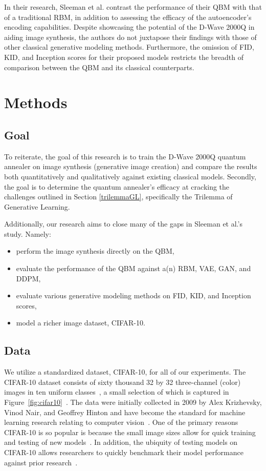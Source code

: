 \documentclass[technologies,article,accept,pdftex,moreauthors]{Definitions/mdpi}
\newcommand{\figref}[1]{Figure~\ref{#1}}
\begin{document}
In their research, Sleeman et al. contrast the performance of their QBM with that of a traditional RBM, in addition to assessing the efficacy of the autoencoder's encoding capabilities. Despite showcasing the potential of the D-Wave 2000Q in aiding image synthesis, the authors do not juxtapose their findings with those of other classical generative modeling methods. Furthermore, the omission of FID, KID, and Inception scores for their proposed models restricts the breadth of comparison between the QBM and its classical counterparts.

\section{Methods}
\subsection{Goal}
To reiterate, the goal of this research is to train the D-Wave 2000Q quantum annealer on image synthesis (generative image creation) and compare the results both quantitatively and qualitatively against existing classical models. Secondly, the goal is to determine the quantum annealer's efficacy at cracking the challenges outlined in Section \ref{trilemmaGL}, specifically the Trilemma of Generative Learning. 



Additionally, our research aims to close many of the gaps in Sleeman et al.'s study. Namely:

\begin{itemize}
    \item perform the image synthesis directly on the QBM,
    \item evaluate the performance of the QBM against a(n) RBM, VAE, GAN, and DDPM,
    \item evaluate various generative modeling methods on FID, KID, and Inception scores,
    \item model a richer image dataset, CIFAR-10.
\end{itemize}

\subsection{Data}
We utilize a standardized dataset, CIFAR-10, for all of our experiments. The CIFAR-10 dataset consists of sixty thousand 32 by 32 three-channel (color) images in ten uniform classes~\cite{CIFAR}, a small selection of which is captured in \figref{fig:cifar10}~\cite{CIFAR}. The data were initially collected in 2009 by Alex Krizhevsky, Vinod Nair, and Geoffrey Hinton and have become the standard for machine learning research relating to computer vision~\cite{Krizhevsky09learningmultiple}. One of the primary reasons CIFAR-10 is so popular is because the small image sizes allow for quick training and testing of new models~\cite{ai_progress_measurement}. In addition, the ubiquity of testing models on CIFAR-10 allows researchers to quickly benchmark their model performance against prior research~\cite{ai_progress_measurement}.
\end{document}
